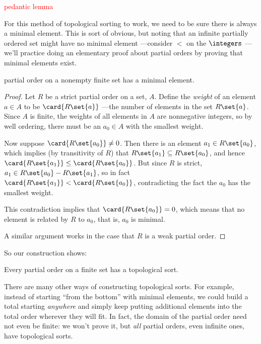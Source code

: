 \begin{staffnotes}
\textcolor{red}{pedantic lemma}

For this method of topological sorting to work, we need to be sure
there is always a minimal element.  This is sort of obvious, but
noting that an infinite partially ordered set might have no minimal
element ---consider $<$ on the $\integers$ ---we'll practice doing an
elementary proof about partial orders by proving that minimal elements
exist.

\begin{lemma}\label{finmin}
   partial order on a nonempty finite set has
  a minimal element.

\begin{proof} Let $R$ be a strict partial order on a set, $A$.  Define the \emph{weight}
of an element $a \in A$ to be $\card{R\set{a}}$ ---the number of
elements in the set $R\set{a}$.  Since $A$ is finite, the weights of
all elements in $A$ are nonnegative integers, so by well ordering,
there must be an $a_0 \in A$ with the smallest weight.

Now suppose $\card{R\set{a_0}} \neq 0$.  Then there is an element $a_1 \in
R\set{a_0}$, which implies (by transitivity of $R$) that $R\set{a_1}
\subseteq R\set{a_0}$, and hence $\card{R\set{a_1}} \leq
\card{R\set{a_0}}$.  But since $R$ is strict, $a_1 \in R\set{a_0} -
R\set{a_1}$, so in fact $\card{R\set{a_1}} < \card{R\set{a_0}}$,
contradicting the fact the $a_0$ has the smallest weight.

This contradiction implies that $\card{R\set{a_0}} = 0$, which means that
no element is related by $R$ to $a_0$, that is, $a_0$ is minimal.

A similar argument works in the case that $R$ is a weak partial order.

\end{proof}
\end{lemma}

\end{staffnotes}

So our construction shows:

\begin{theorem}\label{thm:topological}
Every partial order on a finite set has a topological sort.
\end{theorem}

There are many other ways of constructing topological sorts.  For example,
instead of starting ``from the bottom'' with minimal elements, we could
build a total starting \emph{anywhere} and simply keep putting additional
elements into the total order wherever they will fit.  In fact, the domain
of the partial order need not even be finite: we won't prove it, but \emph{all}
partial orders, even infinite ones, have topological sorts.

